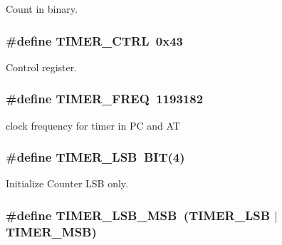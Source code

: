 Count in binary. 

\subsubsection[{\texorpdfstring{T\+I\+M\+E\+R\+\_\+\+C\+T\+RL}{TIMER_CTRL}}]{\setlength{\rightskip}{0pt plus 5cm}\#define T\+I\+M\+E\+R\+\_\+\+C\+T\+RL~0x43}\hypertarget{group__i8254_ga282832448fb0281ef53d243c1cd48491}{}\label{group__i8254_ga282832448fb0281ef53d243c1cd48491}


Control register. 

\subsubsection[{\texorpdfstring{T\+I\+M\+E\+R\+\_\+\+F\+R\+EQ}{TIMER_FREQ}}]{\setlength{\rightskip}{0pt plus 5cm}\#define T\+I\+M\+E\+R\+\_\+\+F\+R\+EQ~1193182}\hypertarget{group__i8254_gacf926951944b6cf370b7229ebd50dd8b}{}\label{group__i8254_gacf926951944b6cf370b7229ebd50dd8b}


clock frequency for timer in PC and AT 

\subsubsection[{\texorpdfstring{T\+I\+M\+E\+R\+\_\+\+L\+SB}{TIMER_LSB}}]{\setlength{\rightskip}{0pt plus 5cm}\#define T\+I\+M\+E\+R\+\_\+\+L\+SB~{\bf B\+IT}(4)}\hypertarget{group__i8254_gac18cb814ebd0d67235392c330e0e3504}{}\label{group__i8254_gac18cb814ebd0d67235392c330e0e3504}


Initialize Counter L\+SB only. 

\subsubsection[{\texorpdfstring{T\+I\+M\+E\+R\+\_\+\+L\+S\+B\+\_\+\+M\+SB}{TIMER_LSB_MSB}}]{\setlength{\rightskip}{0pt plus 5cm}\#define T\+I\+M\+E\+R\+\_\+\+L\+S\+B\+\_\+\+M\+SB~({\bf T\+I\+M\+E\+R\+\_\+\+L\+SB} $\vert$ {\bf T\+I\+M\+E\+R\+\_\+\+M\+SB})}\hypertarget{group__i8254_ga8c0f1933323274c765e23837e4fbc8c7}{}\label{group__i8254_ga8c0f1933323274c765e23837e4fbc8c7}


